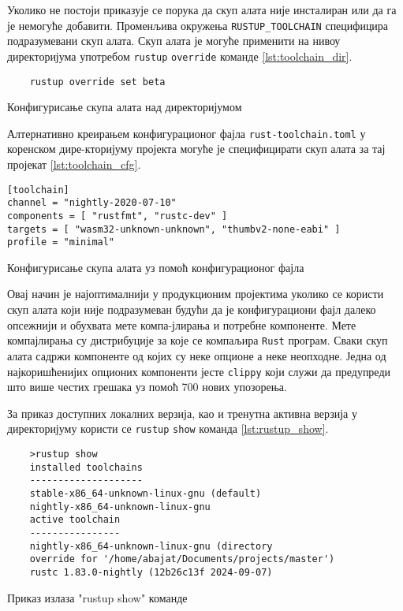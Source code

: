 Уколико не постоји приказује се порука да скуп 
алата није инсталиран или да га је немогуће добавити. Променљива окружења \verb|RUSTUP_TOOLCHAIN| специфицира 
подразумевани скуп алата. Скуп алата је могуће применити на нивоу директоријума употребом \verb|rustup| \verb|override|
команде \ref{lst:toolchain_dir}. 

\begin{listing}[H]
\begin{verbatim}
    rustup override set beta 
\end{verbatim}
\caption{Конфигурисање скупа алата над директоријумом}
\label{lst:toolchain_dir}
\end{listing}

Алтернативно креирањем конфигурационог фајла \verb|rust-toolchain.toml| у коренском 
дире\hyp{}кторијуму пројекта могуће је специфицирати скуп алата за тај пројекат \ref{lst:toolchain_cfg}.

\begin{listing}[H]
\begin{verbatim}
[toolchain]
channel = "nightly-2020-07-10"
components = [ "rustfmt", "rustc-dev" ]
targets = [ "wasm32-unknown-unknown", "thumbv2-none-eabi" ]
profile = "minimal"
\end{verbatim}
\caption{Конфигурисање скупа алата уз помоћ конфигурационог фајла}
\label{lst:toolchain_cfg}
\end{listing}

Овај начин је најоптималнији у продукционим пројектима уколико се користи скуп алата који 
није подразумеван будући да је конфигурациони фајл далеко опсежнији и обухвата мете компа\hyp{}јлирања и 
потребне компоненте. Мете компајлирања су дистрибуције за које се компаљира \verb|Rust| програм.
Сваки скуп алата садржи компоненте од којих су неке опционе а неке неопходне. Једна од најкоришћенијих 
опционих компоненти јесте \verb|clippy| који служи да предупреди што више честих грешака уз помоћ 
700 нових упозорења. 


За приказ доступних локалних верзија, као и тренутна активна верзија у директоријуму користи се \verb|rustup|
\verb|show| команда \ref{lst:rustup_show}.

\begin{listing}[H]
\begin{verbatim}
    >rustup show
    installed toolchains
    --------------------
    stable-x86_64-unknown-linux-gnu (default)
    nightly-x86_64-unknown-linux-gnu
    active toolchain
    ----------------
    nightly-x86_64-unknown-linux-gnu (directory 
    override for '/home/abajat/Documents/projects/master')
    rustc 1.83.0-nightly (12b26c13f 2024-09-07)
\end{verbatim}
\caption{Приказ излаза "rustup show" команде}
\label{lst:rustup_show}
\end{listing}

